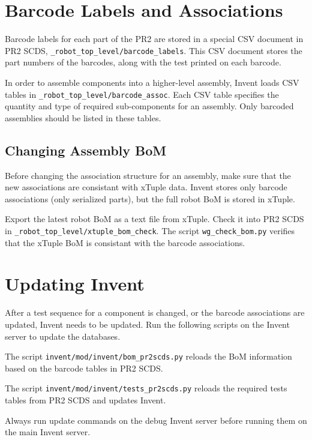 \documentclass[11pt]{report}
\begin{document}
\section{Barcode Labels and Associations}

Barcode labels for each part of the PR2 are stored in a special CSV document in PR2 SCDS, \texttt{\_robot\_top\_level/barcode\_labels}. This CSV document stores the part numbers of the barcodes, along with the test printed on each barcode. 

In order to assemble components into a higher-level assembly, Invent loads CSV tables in \texttt{\_robot\_top\_level/barcode\_assoc}. Each CSV table specifies the quantity and type of required sub-components for an assembly. Only barcoded assemblies should be listed in these tables.


\subsection{Changing Assembly BoM}

Before changing the association structure for an assembly, make sure that the new associations are consistant with xTuple data. Invent stores only barcode associations (only serialized parts), but the full robot BoM is stored in xTuple.

Export the latest robot BoM as a text file from xTuple. Check it into PR2 SCDS in \texttt{\_robot\_top\_level/xtuple\_bom\_check}. The script \texttt{wg\_check\_bom.py} verifies that the xTuple BoM is consistant with the barcode associations.

\section{Updating Invent}

After a test sequence for a component is changed, or the barcode associations are updated, Invent needs to be updated. Run the following scripts on the Invent server to update the databases.

The script \texttt{invent/mod/invent/bom\_pr2scds.py} reloads the BoM information based on the barcode tables in PR2 SCDS. 

The script \texttt{invent/mod/invent/tests\_pr2scds.py} reloads the required tests tables from PR2 SCDS and updates Invent.

Always run update commands on the debug Invent server before running them on the main Invent server.
\end{document}
